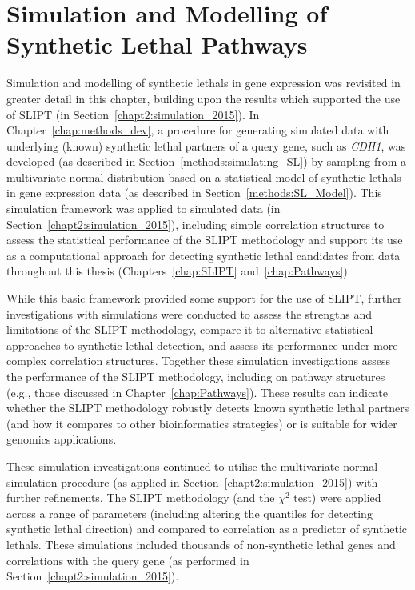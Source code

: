 \chapter{Simulation and Modelling of Synthetic Lethal Pathways}
\label{chap:simulation}

Simulation and modelling of \glspl{synthetic lethal} in \gls{gene expression} was revisited in greater detail in this chapter, building upon the results which supported the use of \gls{SLIPT} (in Section~\ref{chapt2:simulation_2015}). In Chapter~\ref{chap:methods_dev}, a procedure for generating simulated data with underlying (known) \gls{synthetic lethal} partners of a query gene, such as \textit{CDH1}, was developed (as described in Section~\ref{methods:simulating_SL}) by sampling from a multivariate normal distribution based on a statistical model of \glspl{synthetic lethal} in \gls{gene expression} data (as described in Section~\ref{methods:SL_Model}). This simulation framework was applied to simulated data (in Section~\ref{chapt2:simulation_2015}), including simple correlation structures to assess the statistical performance of the \gls{SLIPT} methodology and support its use as a computational approach for detecting \gls{synthetic lethal} candidates from  data throughout this thesis (Chapters~\ref{chap:SLIPT} and~\ref{chap:Pathways}). 

While this basic framework provided some support for the use of \gls{SLIPT}, further investigations with simulations were conducted to assess the strengths and limitations of the \gls{SLIPT} methodology, compare it to alternative statistical approaches to \gls{synthetic lethal} detection, and assess its performance under more complex correlation structures. Together these simulation investigations assess the performance of the \gls{SLIPT} methodology, including on pathway  structures (e.g., those discussed in Chapter~\ref{chap:Pathways}). These results can indicate whether the \gls{SLIPT} methodology robustly detects known \gls{synthetic lethal} partners (and how it compares to other \gls{bioinformatics} strategies) or is suitable for wider \glspl{genomic} applications.

These simulation investigations \textcolor{black}{continued} to utilise the multivariate normal simulation procedure (as applied in Section~\ref{chapt2:simulation_2015}) with further refinements. The \gls{SLIPT} methodology (and the $\chi^2$ test) were applied across a range of parameters (including altering the quantiles for detecting \gls{synthetic lethal} direction) and compared to correlation as a predictor of \glspl{synthetic lethal}. These simulations included thousands of non-synthetic lethal genes and correlations with the query gene (as performed in Section~\ref{chapt2:simulation_2015}).

